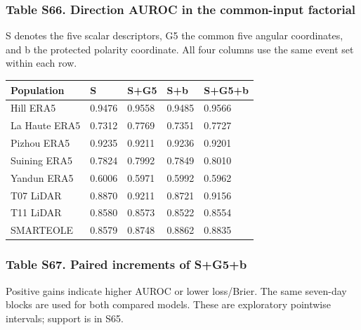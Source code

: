 \documentclass[a4paper,11pt]{article}
\newcounter{none}
\begin{document}
\subsubsection{Table S66. Direction AUROC in the common-input factorial}\label{table-s66.-direction-auroc-in-the-common-input-factorial}

S denotes the five scalar descriptors, G5 the common five angular coordinates, and b the protected polarity coordinate. All four columns use the same event set within each row.

{\def\LTcaptype{none} %
\begin{longtable}[]{@{}lllll@{}}
\toprule\noalign{}
Population & S & S+G5 & S+b & S+G5+b \\
\midrule\noalign{}
\endhead
\bottomrule\noalign{}
\endlastfoot
Hill ERA5 & 0.9476 & 0.9558 & 0.9485 & 0.9566 \\
La Haute ERA5 & 0.7312 & 0.7769 & 0.7351 & 0.7727 \\
Pizhou ERA5 & 0.9235 & 0.9211 & 0.9236 & 0.9201 \\
Suining ERA5 & 0.7824 & 0.7992 & 0.7849 & 0.8010 \\
Yandun ERA5 & 0.6006 & 0.5971 & 0.5992 & 0.5962 \\
T07 LiDAR & 0.8870 & 0.9211 & 0.8721 & 0.9156 \\
T11 LiDAR & 0.8580 & 0.8573 & 0.8522 & 0.8554 \\
SMARTEOLE & 0.8579 & 0.8748 & 0.8862 & 0.8835 \\
\end{longtable}
}

\subsubsection{Table S67. Paired increments of S+G5+b}\label{table-s67.-paired-increments-of-sg5b}

Positive gains indicate higher AUROC or lower loss/Brier. The same seven-day blocks are used for both compared models. These are exploratory pointwise intervals; support is in S65.
\end{document}
